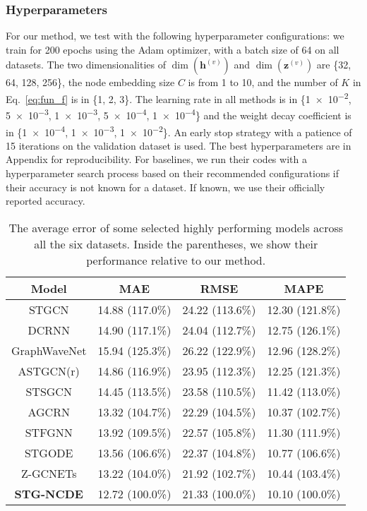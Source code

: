 \documentclass[letterpaper]{article} \usepackage{aaai22}  \usepackage{times}  \usepackage{helvet}  \usepackage{courier}  \usepackage[hyphens]{url}  \usepackage{graphicx} \urlstyle{rm} \def\UrlFont{\rm}  \usepackage{natbib}  \usepackage{caption} \DeclareCaptionStyle{ruled}{labelfont=normalfont,labelsep=colon,strut=off} \frenchspacing  \setlength{\pdfpagewidth}{8.5in}  \setlength{\pdfpageheight}{11in}  \usepackage{stfloats}
\begin{document}
\subsubsection{Hyperparameters}
For our method, we test with the following hyperparameter configurations: we train for 200 epochs using the Adam optimizer, with a batch size of 64 on all datasets. The two dimensionalities of $\dim(\bm{h}^{(v)})$ and $\dim(\bm{z}^{(v)})$ are \{32, 64, 128, 256\}, the node embedding size $C$ is from 1 to 10, and the number of $K$ in Eq.~\eqref{eq:fun_f} is in \{1, 2, 3\}.  The learning rate in all methods is in \{\num{1e-2}, \num{5e-3}, \num{1e-3}, \num{5e-4}, \num{1e-4}\} and the weight decay coefficient is in \{\num{1e-4}, \num{1e-3}, \num{1e-2}\}. An early stop strategy with a patience of 15 iterations on the validation dataset is used. The best hyperparameters are in Appendix for reproducibility. For baselines, we run their codes with a hyperparameter search process based on their recommended configurations if their accuracy is not known for a dataset. If known, we use their officially reported accuracy.


\begin{table}[t]
\small
    \setlength{\tabcolsep}{2pt}
    \centering
    \begin{tabular}{c ccc}
    \hline
        Model                &   MAE                 &   RMSE                &  MAPE\\\hline
        STGCN                & 14.88 (117.0\%)       & 24.22 (113.6\%)       & 12.30 (121.8\%)\\
        DCRNN                & 14.90 (117.1\%)       & 24.04 (112.7\%)       & 12.75 (126.1\%)\\
        GraphWaveNet         & 15.94 (125.3\%)       & 26.22 (122.9\%)       & 12.96 (128.2\%) \\
        ASTGCN(r)            & 14.86 (116.9\%)       & 23.95 (112.3\%)       & 12.25 (121.3\%) \\
        STSGCN               & 14.45 (113.5\%)       & 23.58 (110.5\%)       & 11.42 (113.0\%) \\
        AGCRN                & 13.32 (104.7\%)       & 22.29 (104.5\%)       & 10.37 (102.7\%) \\
        STFGNN               & 13.92 (109.5\%)       & 22.57 (105.8\%)       & 11.30 (111.9\%) \\
        STGODE               & 13.56 (106.6\%)       & 22.37 (104.8\%)       & 10.77 (106.6\%) \\
        Z-GCNETs             & 13.22 (104.0\%)       & 21.92 (102.7\%)       & 10.44 (103.4\%) \\\hline
        \textbf{STG-NCDE}    & 12.72 (100.0\%)       & 21.33 (100.0\%)       & 10.10 (100.0\%)\\
    \hline
    \end{tabular}
    \caption{The average error of some selected highly performing models across all the six datasets. Inside the parentheses, we show their performance relative to our method.}
    \label{tab:average}
\end{table}
\end{document}
